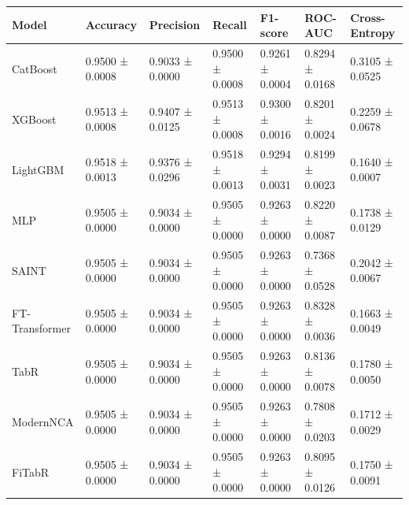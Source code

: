 \begin{tabular}{lllllll}
\toprule
         Model &        Accuracy &       Precision &          Recall &        F1-score &         ROC-AUC &   Cross-Entropy \\
\midrule
      CatBoost & 0.9500 ± 0.0008 & 0.9033 ± 0.0000 & 0.9500 ± 0.0008 & 0.9261 ± 0.0004 & 0.8294 ± 0.0168 & 0.3105 ± 0.0525 \\
       XGBoost & 0.9513 ± 0.0008 & 0.9407 ± 0.0125 & 0.9513 ± 0.0008 & 0.9300 ± 0.0016 & 0.8201 ± 0.0024 & 0.2259 ± 0.0678 \\
      LightGBM & 0.9518 ± 0.0013 & 0.9376 ± 0.0296 & 0.9518 ± 0.0013 & 0.9294 ± 0.0031 & 0.8199 ± 0.0023 & 0.1640 ± 0.0007 \\
           MLP & 0.9505 ± 0.0000 & 0.9034 ± 0.0000 & 0.9505 ± 0.0000 & 0.9263 ± 0.0000 & 0.8220 ± 0.0087 & 0.1738 ± 0.0129 \\
         SAINT & 0.9505 ± 0.0000 & 0.9034 ± 0.0000 & 0.9505 ± 0.0000 & 0.9263 ± 0.0000 & 0.7368 ± 0.0528 & 0.2042 ± 0.0067 \\
FT-Transformer & 0.9505 ± 0.0000 & 0.9034 ± 0.0000 & 0.9505 ± 0.0000 & 0.9263 ± 0.0000 & 0.8328 ± 0.0036 & 0.1663 ± 0.0049 \\
          TabR & 0.9505 ± 0.0000 & 0.9034 ± 0.0000 & 0.9505 ± 0.0000 & 0.9263 ± 0.0000 & 0.8136 ± 0.0078 & 0.1780 ± 0.0050 \\
     ModernNCA & 0.9505 ± 0.0000 & 0.9034 ± 0.0000 & 0.9505 ± 0.0000 & 0.9263 ± 0.0000 & 0.7808 ± 0.0203 & 0.1712 ± 0.0029 \\
        FiTabR & 0.9505 ± 0.0000 & 0.9034 ± 0.0000 & 0.9505 ± 0.0000 & 0.9263 ± 0.0000 & 0.8095 ± 0.0126 & 0.1750 ± 0.0091 \\
\bottomrule
\end{tabular}
